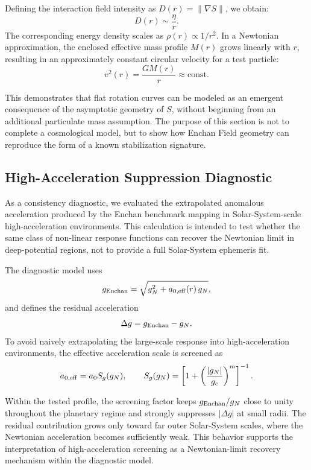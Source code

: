 \documentclass[11pt,a4paper]{article}
\begin{document}
Defining the interaction field intensity as $D(r) = \|\nabla S\|$, we obtain:
\begin{equation}
D(r) \sim \frac{\eta}{r}.
\end{equation}
The corresponding energy density scales as $\rho(r) \propto 1/r^2$. In a Newtonian approximation, the enclosed effective mass profile $M(r)$ grows linearly with $r$, resulting in an approximately constant circular velocity for a test particle:
\begin{equation}
v^2(r) = \frac{G M(r)}{r} \approx \text{const}.
\end{equation}

This demonstrates that flat rotation curves can be modeled as an emergent consequence of the asymptotic geometry of $S$, without beginning from an additional particulate mass assumption. The purpose of this section is not to complete a cosmological model, but to show how Enchan Field geometry can reproduce the form of a known stabilization signature.

\subsection{High-Acceleration Suppression Diagnostic}

As a consistency diagnostic, we evaluated the extrapolated anomalous acceleration produced by the Enchan benchmark mapping in Solar-System-scale high-acceleration environments. This calculation is intended to test whether the same class of non-linear response functions can recover the Newtonian limit in deep-potential regions, not to provide a full Solar-System ephemeris fit.

The diagnostic model uses
\begin{equation}
 g_{\rm Enchan} = \sqrt{g_N^2 + a_{0,{\rm eff}}(r)\,g_N},
\end{equation}
and defines the residual acceleration
\begin{equation}
 \Delta g = g_{\rm Enchan} - g_N.
\end{equation}
To avoid naively extrapolating the large-scale response into high-acceleration environments, the effective acceleration scale is screened as
\begin{equation}
 a_{0,{\rm eff}} = a_0 S_g(g_N),
 \qquad
 S_g(g_N)=\left[1+\left(\frac{|g_N|}{g_c}\right)^m\right]^{-1}.
\end{equation}

Within the tested profile, the screening factor keeps $g_{\rm Enchan}/g_N$ close to unity throughout the planetary regime and strongly suppresses $|\Delta g|$ at small radii. The residual contribution grows only toward far outer Solar-System scales, where the Newtonian acceleration becomes sufficiently weak. This behavior supports the interpretation of high-acceleration screening as a Newtonian-limit recovery mechanism within the diagnostic model.
\end{document}
